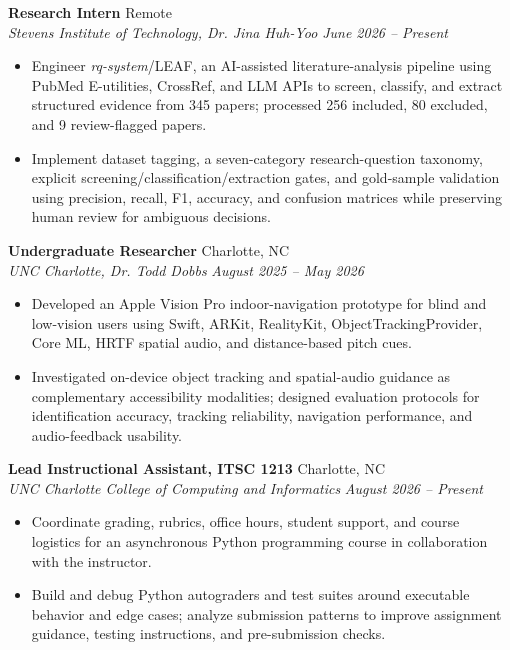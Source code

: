 \documentclass[letterpaper,10pt]{article}
\newcommand{\resumeentry}[4]{
  \noindent\textbf{#1} \hfill #2 \\
  \textit{#3} \hfill \textit{#4}
}
\begin{document}
\resumeentry
  {Research Intern}{Remote}
  {Stevens Institute of Technology, Dr. Jina Huh-Yoo}{June 2026 -- Present}
\begin{itemize}
  \item Engineer \textit{rq-system}/LEAF, an AI-assisted literature-analysis pipeline using PubMed E-utilities, CrossRef, and LLM APIs to screen, classify, and extract structured evidence from 345 papers; processed 256 included, 80 excluded, and 9 review-flagged papers.
  \item Implement dataset tagging, a seven-category research-question taxonomy, explicit screening/classification/extraction gates, and gold-sample validation using precision, recall, F1, accuracy, and confusion matrices while preserving human review for ambiguous decisions.
\end{itemize}

\smallskip

\resumeentry
  {Undergraduate Researcher}{Charlotte, NC}
  {UNC Charlotte, Dr. Todd Dobbs}{August 2025 -- May 2026}
\begin{itemize}
  \item Developed an Apple Vision Pro indoor-navigation prototype for blind and low-vision users using Swift, ARKit, RealityKit, ObjectTrackingProvider, Core ML, HRTF spatial audio, and distance-based pitch cues.
  \item Investigated on-device object tracking and spatial-audio guidance as complementary accessibility modalities; designed evaluation protocols for identification accuracy, tracking reliability, navigation performance, and audio-feedback usability.
\end{itemize}

\smallskip

\resumeentry
  {Lead Instructional Assistant, ITSC 1213}{Charlotte, NC}
  {UNC Charlotte College of Computing and Informatics}{August 2026 -- Present}
\begin{itemize}
  \item Coordinate grading, rubrics, office hours, student support, and course logistics for an asynchronous Python programming course in collaboration with the instructor.
  \item Build and debug Python autograders and test suites around executable behavior and edge cases; analyze submission patterns to improve assignment guidance, testing instructions, and pre-submission checks.
\end{itemize}
\end{document}
